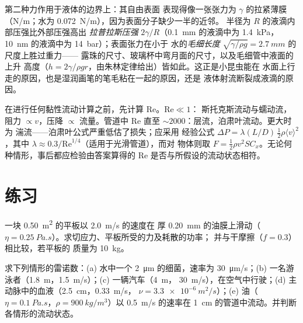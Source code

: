 \begin{remark}[表面张力]\label{rem:b2:viscous-flows:capillarity}
第二种力作用于液体的边界上：其自由表面
表现得像一张张力为 $\gamma$ 的拉紧薄膜（\unit{N/m}；水为 
\qty{0.072}{N/m}），因为表面分子缺少一半的近邻。
半径为 $R$ 的液滴内部压强比外部压强高出
\emph{拉普拉斯压强} $2\gamma/R$（\qty{0.1}{mm} 的液滴中为 \qty{1.4}{kPa}，
\qty{10}{nm} 的液滴中为 \qty{14}{bar}）；表面张力在小于
水的\emph{毛细长度} $\sqrt{\gamma/\rho g} = \qty{2.7}{mm}$ 的尺度上胜过重力——
露珠的尺寸、玻璃杯中弯月面的尺寸，以及毛细管中液面的上升
高度（$h = 2\gamma/\rho gr$，由朱林定律给出）皆如此。这正是小昆虫能在
水面上行走的原因，也是湿润画笔的笔毛粘在一起的原因，还是
液体射流断裂成液滴的原因。
\end{remark}

\begin{method}[判断流动状态]\label{met:b2:viscous-flows:regime}
在进行任何黏性流动计算之前，先计算 $\mathrm{Re}$。$\mathrm{Re} \ll 1$：
斯托克斯流动与蠕动流，阻力 $\propto v$，压降 $\propto$
流量。管道中 $\mathrm{Re}$ 直至 $\sim\!2000$：层流，泊肃叶流动。更大时为
湍流——泊肃叶公式严重低估了损失；应采用
经验公式 $\Delta P = \lambda(L/D)\,\tfrac12\rho\langle v\rangle^2$，其中 $\lambda
\approx 0.3/\mathrm{Re}^{1/4}$（适用于光滑管道），而对
物体则取 $F = \tfrac12\rho v^2SC_x$。无论何种情形，事后都应检验由答案算得的 $\mathrm{Re}$
是否与所假设的流动状态相符。
\end{method}

\section{练习}

\begin{exercise}[$\star$]\label{exo:b2:viscous-flows:1}
一块 \qty{0.50}{m^2} 的平板以 \qty{2.0}{m/s} 的速度在
厚 \qty{0.20}{mm} 的油膜上滑动（$\eta = \qty{0.25}{Pa.s}$）。求切应力、平板所受的力及耗散的功率；
并与干摩擦（$f = 0.3$）相比较，若平板的
质量为 \qty{10}{kg}。
\end{exercise}

\begin{exercise}[$\star$]\label{exo:b2:viscous-flows:2}
求下列情形的雷诺数：(a) 水中一个 \qty{2}{\micro m} 的细菌，速率为 
\qty{30}{\micro m/s}；(b) 一名游泳者（\qty{1.8}{m}，\qty{1.5}{m/s}）；(c) 一辆汽车（\qty{4}{m}，
\qty{30}{m/s}），在空气中行驶；(d) 主动脉中的血液（\qty{2.5}{cm}，\qty{0.33}{m/s}，
$\nu = \qty{3.3e-6}{m^2/s}$）；(e) 油（$\eta = \qty{0.1}{Pa.s}$，$\rho =
\qty{900}{kg/m^3}$）以 \qty{0.5}{m/s} 的速率在 \qty{1}{cm} 的管道中流动。并判断各情形的流动状态。
\end{exercise}

